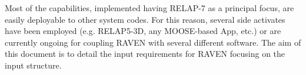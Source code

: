 
%
Most of the capabilities, implemented having RELAP-7 as a principal focus, are
easily deployable to other system codes.
%
For this reason, several side activates have been employed (e.g.  RELAP5-3D, any MOOSE-based App, etc.)
or are currently ongoing for coupling RAVEN with several different software.
%
The aim of this document is to detail the input requirements for RAVEN focusing
on the input structure.
